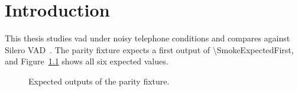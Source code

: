 \chapter{Introduction}
This thesis studies \ac{vad} under noisy telephone conditions and compares against Silero VAD~\cite{silero-vad}.
The parity fixture expects a first output of \num{\SmokeExpectedFirst}, and Figure~\ref{fig:smoke-expected} shows all six expected values.

\begin{figure}[htbp]
    \centering
    
    \caption{Expected outputs of the parity fixture.}
    \label{fig:smoke-expected}
\end{figure}
